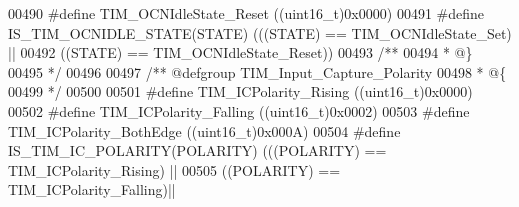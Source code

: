 \begin{DoxyCode}
00490 \textcolor{preprocessor}{#}\textcolor{preprocessor}{define} \textcolor{preprocessor}{TIM\_OCNIdleState\_Reset}             \textcolor{preprocessor}{(}\textcolor{preprocessor}{(}\textcolor{preprocessor}{uint16\_t}\textcolor{preprocessor}{)}0x0000\textcolor{preprocessor}{)}
00491 \textcolor{preprocessor}{#}\textcolor{preprocessor}{define} \textcolor{preprocessor}{IS\_TIM\_OCNIDLE\_STATE}\textcolor{preprocessor}{(}\textcolor{preprocessor}{STATE}\textcolor{preprocessor}{)} \textcolor{preprocessor}{(}\textcolor{preprocessor}{(}\textcolor{preprocessor}{(}\textcolor{preprocessor}{STATE}\textcolor{preprocessor}{)} \textcolor{preprocessor}{==} TIM_OCNIdleState_Set\textcolor{preprocessor}{)} \textcolor{preprocessor}{||}
00492                                      \textcolor{preprocessor}{(}\textcolor{preprocessor}{(}\textcolor{preprocessor}{STATE}\textcolor{preprocessor}{)} \textcolor{preprocessor}{==} TIM_OCNIdleState_Reset\textcolor{preprocessor}{)}\textcolor{preprocessor}{)}
00493 \textcolor{comment}{/**}
00494 \textcolor{comment}{  * @\}}
00495 \textcolor{comment}{  */}
00496 
00497 \textcolor{comment}{/** @defgroup TIM\_Input\_Capture\_Polarity }
00498 \textcolor{comment}{  * @\{}
00499 \textcolor{comment}{  */}
00500 
00501 \textcolor{preprocessor}{#}\textcolor{preprocessor}{define}  \textcolor{preprocessor}{TIM\_ICPolarity\_Rising}             \textcolor{preprocessor}{(}\textcolor{preprocessor}{(}\textcolor{preprocessor}{uint16\_t}\textcolor{preprocessor}{)}0x0000\textcolor{preprocessor}{)}
00502 \textcolor{preprocessor}{#}\textcolor{preprocessor}{define}  \textcolor{preprocessor}{TIM\_ICPolarity\_Falling}            \textcolor{preprocessor}{(}\textcolor{preprocessor}{(}\textcolor{preprocessor}{uint16\_t}\textcolor{preprocessor}{)}0x0002\textcolor{preprocessor}{)}
00503 \textcolor{preprocessor}{#}\textcolor{preprocessor}{define}  \textcolor{preprocessor}{TIM\_ICPolarity\_BothEdge}           \textcolor{preprocessor}{(}\textcolor{preprocessor}{(}\textcolor{preprocessor}{uint16\_t}\textcolor{preprocessor}{)}0x000A\textcolor{preprocessor}{)}
00504 \textcolor{preprocessor}{#}\textcolor{preprocessor}{define} \textcolor{preprocessor}{IS\_TIM\_IC\_POLARITY}\textcolor{preprocessor}{(}\textcolor{preprocessor}{POLARITY}\textcolor{preprocessor}{)} \textcolor{preprocessor}{(}\textcolor{preprocessor}{(}\textcolor{preprocessor}{(}\textcolor{preprocessor}{POLARITY}\textcolor{preprocessor}{)} \textcolor{preprocessor}{==} TIM_ICPolarity_Rising\textcolor{preprocessor}{)} \textcolor{preprocessor}{||}
00505                                       \textcolor{preprocessor}{(}\textcolor{preprocessor}{(}\textcolor{preprocessor}{POLARITY}\textcolor{preprocessor}{)} \textcolor{preprocessor}{==} TIM_ICPolarity_Falling\textcolor{preprocessor}{)}\textcolor{preprocessor}{||}

\end{DoxyCode}
